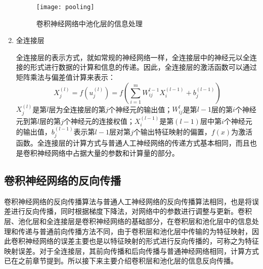\begin{enumerate}
\begin{figure}[H] %
  \centering
  \texttt{[image: pooling]}
  \caption{卷积神经网络中池化层的信息处理}
\end{figure}

\item 全连接层

全连接层的表示方式，就如常规的神经网络一样，全连接层中的神经元以全连接的形式进行数据的计算和信息的传递。因此，全连接层的激活函数可以通过矩阵乘法与偏差值计算来表示：
\begin{equation}
X_{j}^{(l)}=f(u_{j}^{(l)})=f(\sum_{i=1}^{m} W_{ij}^{l-1} X_{i}^{(l-1)} + b_{j}^{(l-1)})
\end{equation}
$X_{j}^{(l)}$是第$l$层为全连接层的第$j$个神经元的输出值；$W_{ij}^{l}$是第$l-1$层的第$i$个神经元到第$l$层的第$j$个神经元的连接权值；$X_{i}^{(l-1)}$是第$(l-1)$层中第$i$个神经元的输出值，$b_{j}^{(l-1)}$表示第$l-1$层对第$j$个输出特征映射的偏置，$f(x)$为激活函数。全连接层的计算方式与普通人工神经网络的传递方式基本相同，而且也是卷积神经网络中占据大量的参数和计算量的部分。

\end{enumerate}


\subsection{卷积神经网络的反向传播}

卷积神经网络的反向传播算法与普通人工神经网络的反向传播算法相同，也是将误差进行反向传播，同时根据梯度下降法，对网络中的参数进行调整与更新。卷积层、池化层和全连接层是卷积神经网络的基础部分，在卷积层和池化层中的信息处理和传递与普通前向传播方法不同，由于卷积层和池化层中传输的为特征映射，因此卷积神经网络的误差主要也是以特征映射的形式进行反向传播的，可称之为特征映射误差。对于全连接层，其前向传播和后向传播与普通神经网络相同，计算方式已在之前章节提到。所以接下来主要介绍卷积层和池化层的信息反向传播。 

